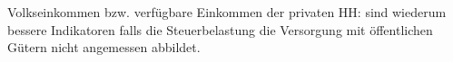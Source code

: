 \documentclass{scrartcl}
\begin{document}
\begin{itemize}
Volkseinkommen bzw. verf\"{u}gbare Einkommen der privaten HH: sind wiederum bessere Indikatoren falls die Steuerbelastung die Versorgung mit \"{o}ffentlichen G\"{u}tern nicht angemessen abbildet.
\end{itemize}
\end{document}
